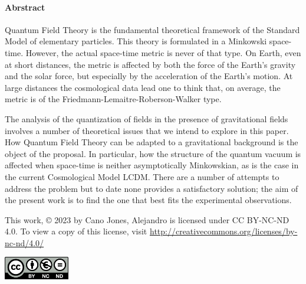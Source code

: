 \vspace*{1.0cm}
	\paragraph{Abrstract\\}
	\begin{minipage}{12cm}
		
	\vspace*{0.5cm}
	
	Quantum Field Theory is the fundamental theoretical framework of the Standard Model of elementary particles. This theory is formulated in a Minkowski space-time. However, the actual space-time metric is never of that type. On Earth, even at short distances, the metric is affected by both the force of the Earth's gravity and the solar force, but especially by the acceleration of the Earth's motion. At large distances the cosmological data lead one to think that, on average, the metric is of the Friedmann-Lemaitre-Roberson-Walker type.
	
	\vspace*{0.2cm}
	
	The analysis of the quantization of fields in the presence of gravitational fields involves a number of theoretical issues that we intend to explore in this paper. How Quantum Field Theory can be adapted to a gravitational background is the object of the proposal. In particular, how the structure of the quantum vacuum is affected when space-time is neither asymptotically Minkowskian, as is the case in the current Cosmological Model LCDM. There are a number of attempts to address the problem but to date none provides a satisfactory solution; the aim of the present work is to find the one that best fits the experimental observations.
	
	\end{minipage}
	
	\vspace*{\fill}
	
	
	This work, © 2023 by Cano Jones, Alejandro is licensed under CC BY-NC-ND 4.0. To view a copy of this license, visit \href{http://creativecommons.org/licenses/by-nc-nd/4.0/}{http://creativecommons.org/licenses/by-nc-nd/4.0/}
	
	
	\begin{flushright}
		\includegraphics[height=1cm]{Images/Logos/by-nc-nd.eu}
	\end{flushright}
